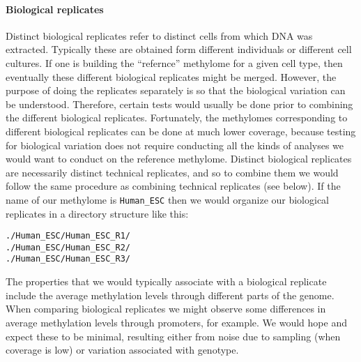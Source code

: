 \documentclass[10pt]{article}
\begin{document}
\paragraph{Biological replicates}
Distinct biological replicates refer to distinct cells from which DNA
was extracted. Typically these are obtained form different individuals
or different cell cultures. If one is building the ``refernce''
methylome for a given cell type, then eventually these different
biological replicates might be merged. However, the purpose of doing
the replicates separately is so that the biological variation can be
understood. Therefore, certain tests would usually be done prior to
combining the different biological replicates. Fortunately, the
methylomes corresponding to different biological replicates can be
done at much lower coverage, because testing for biological variation
does not require conducting all the kinds of analyses we would want to
conduct on the reference methylome. Distinct biological replicates are
necessarily distinct technical replicates, and so to combine them we
would follow the same procedure as combining technical replicates (see
below). If the name of our methylome is \texttt{Human\_ESC} then we
would organize our biological replicates in a directory structure like
this:
\begin{verbatim}
./Human_ESC/Human_ESC_R1/
./Human_ESC/Human_ESC_R2/
./Human_ESC/Human_ESC_R3/
\end{verbatim}
The properties that we would typically associate with a biological
replicate include the average methylation levels through different
parts of the genome. When comparing biological replicates we might
observe some differences in average methylation levels through
promoters, for example. We would hope and expect these to be minimal,
resulting either from noise due to sampling (when coverage is low) or
variation associated with genotype.
\end{document}
